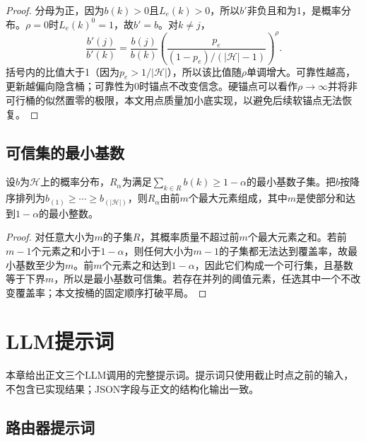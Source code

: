 \begin{proof}
分母为正，因为$b(k)>0$且$L_e(k)>0$，所以$b'$非负且和为1，是概率分布。$\rho=0$时$L_e(k)^0=1$，故$b'=b$。对$k\ne j$，
\[
\frac{b'(j)}{b'(k)}
=\frac{b(j)}{b(k)}
\left(\frac{p_e}{(1-p_e)/(|\mathcal H|-1)}\right)^\rho.
\]
括号内的比值大于1（因为$p_e>1/|\mathcal H|$），所以该比值随$\rho$单调增大。可靠性越高，更新越偏向隐含桶；可靠性为0时锚点不改变信念。硬锚点可以看作$\rho\to\infty$并将非可行桶的似然置零的极限，本文用点质量加小底实现，以避免后续软锚点无法恢复。
\end{proof}

\section{可信集的最小基数}

\begin{proposition}
设$b$为$\mathcal H$上的概率分布，$R_\alpha$为满足$\sum_{k\in R}b(k)\ge 1-\alpha$的最小基数子集。把$b$按降序排列为$b_{(1)}\ge\cdots\ge b_{(|\mathcal H|)}$，则$R_\alpha$由前$m$个最大元素组成，其中$m$是使部分和达到$1-\alpha$的最小整数。
\end{proposition}

\begin{proof}
对任意大小为$m$的子集$R$，其概率质量不超过前$m$个最大元素之和。若前$m-1$个元素之和小于$1-\alpha$，则任何大小为$m-1$的子集都无法达到覆盖率，故最小基数至少为$m$。前$m$个元素之和达到$1-\alpha$，因此它们构成一个可行集，且基数等于下界$m$，所以是最小基数可信集。若存在并列的阈值元素，任选其中一个不改变覆盖率；本文按桶的固定顺序打破平局。
\end{proof}

\chapter{LLM提示词}
\label{app:prompts}

本章给出正文三个LLM调用的完整提示词。提示词只使用截止时点之前的输入，不包含已实现结果；JSON字段与正文的结构化输出一致。

\section{路由器提示词}

